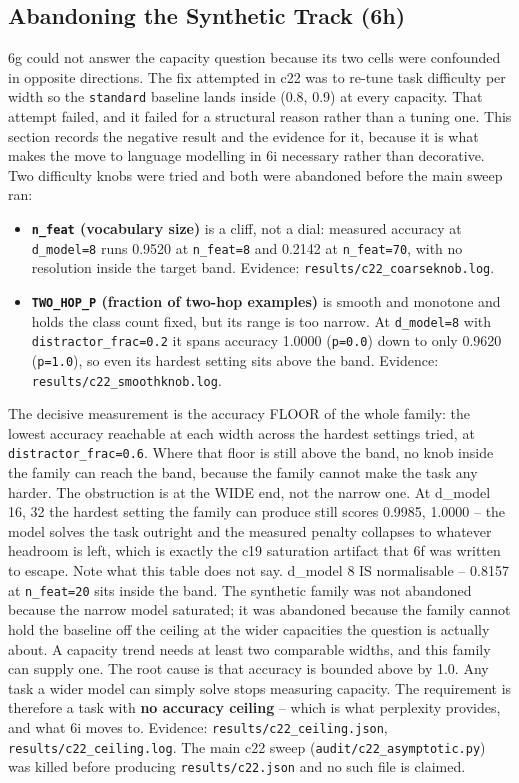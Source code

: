 \documentclass[10pt,journal]{IEEEtran}
\begin{document}
\subsection{Abandoning the Synthetic Track (6h)}
6g could not answer the capacity question because its two cells were confounded in opposite directions. The fix attempted in c22 was to re-tune task difficulty per width so the \texttt{standard} baseline lands inside (0.8, 0.9) at every capacity. That attempt failed, and it failed for a structural reason rather than a tuning one. This section records the negative result and the evidence for it, because it is what makes the move to language modelling in 6i necessary rather than decorative.
Two difficulty knobs were tried and both were abandoned before the main sweep ran:
\begin{itemize}
\item \textbf{\texttt{n\_feat} (vocabulary size)} is a cliff, not a dial: measured accuracy at \texttt{d\_model=8} runs 0.9520 at \texttt{n\_feat=8} and 0.2142 at \texttt{n\_feat=70}, with no resolution inside the target band. Evidence: \texttt{results/c22\_coarseknob.log}.
\item \textbf{\texttt{TWO\_HOP\_P} (fraction of two-hop examples)} is smooth and monotone and holds the class count fixed, but its range is too narrow. At \texttt{d\_model=8} with \texttt{distractor\_frac=0.2} it spans accuracy 1.0000 (\texttt{p=0.0}) down to only 0.9620 (\texttt{p=1.0}), so even its hardest setting sits above the band. Evidence: \texttt{results/c22\_smoothknob.log}.
\end{itemize}
The decisive measurement is the accuracy FLOOR of the whole family: the lowest accuracy reachable at each width across the hardest settings tried, at \texttt{distractor\_frac=0.6}. Where that floor is still above the band, no knob inside the family can reach the band, because the family cannot make the task any harder.
The obstruction is at the WIDE end, not the narrow one. At d\_model 16, 32 the hardest setting the family can produce still scores 0.9985, 1.0000 -- the model solves the task outright and the measured penalty collapses to whatever headroom is left, which is exactly the c19 saturation artifact that 6f was written to escape.
Note what this table does not say. d\_model 8 IS normalisable -- 0.8157 at \texttt{n\_feat=20} sits inside the band. The synthetic family was not abandoned because the narrow model saturated; it was abandoned because the family cannot hold the baseline off the ceiling at the wider capacities the question is actually about. A capacity trend needs at least two comparable widths, and this family can supply one.
The root cause is that accuracy is bounded above by 1.0. Any task a wider model can simply solve stops measuring capacity. The requirement is therefore a task with \textbf{no accuracy ceiling} -- which is what perplexity provides, and what 6i moves to.
Evidence: \texttt{results/c22\_ceiling.json}, \texttt{results/c22\_ceiling.log}. The main c22 sweep (\texttt{audit/c22\_asymptotic.py}) was killed before producing \texttt{results/c22.json} and no such file is claimed.
\end{document}
